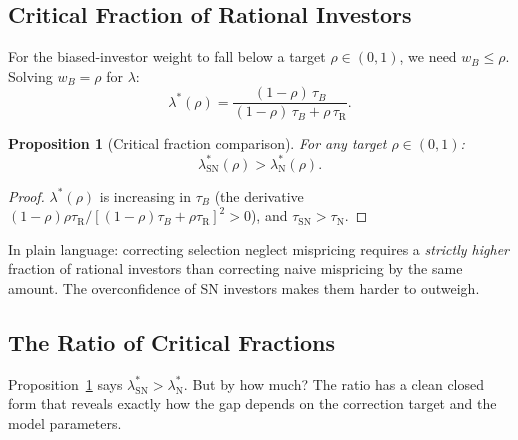 \documentclass[12pt]{article}
\theoremstyle{plain}
\newtheorem{proposition}{Proposition}
\theoremstyle{definition}
\newcommand{\R}{\mathrm{R}}
\newcommand{\SN}{\mathrm{SN}}
\newcommand{\N}{\mathrm{N}}
\begin{document}
\subsection{Critical Fraction of Rational Investors}
\label{sec:critical}

For the biased-investor weight to fall below a target $\rho \in (0,1)$, we need $w_B \leq \rho$. Solving $w_B = \rho$ for $\lambda$:
\begin{equation}
\lambda^*(\rho) = \frac{(1-\rho)\,\tau_B}{(1-\rho)\,\tau_B + \rho\,\tau_\R}.
\label{eq:lambda_star}
\end{equation}

\begin{proposition}[Critical fraction comparison]
\label{prop:critical}
For any target $\rho \in (0,1)$:
\begin{equation}
\lambda^*_\SN(\rho) > \lambda^*_\N(\rho).
\end{equation}
\end{proposition}

\begin{proof}
$\lambda^*(\rho)$ is increasing in $\tau_B$ (the derivative $(1-\rho)\rho\tau_\R / [(1-\rho)\tau_B + \rho\tau_\R]^2 > 0$), and $\tau_\SN > \tau_\N$.
\end{proof}

In plain language: correcting selection neglect mispricing requires a \emph{strictly higher} fraction of rational investors than correcting naive mispricing by the same amount. The overconfidence of SN investors makes them harder to outweigh.

\subsection{The Ratio of Critical Fractions}

Proposition~\ref{prop:critical} says $\lambda^*_\SN > \lambda^*_\N$. But by how much? The ratio has a clean closed form that reveals exactly how the gap depends on the correction target and the model parameters.
\end{document}
